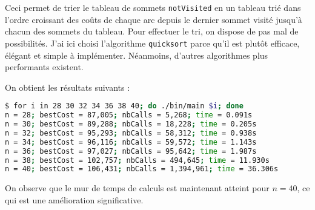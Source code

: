 Ceci permet de trier le tableau de sommets \texttt{notVisited} en un tableau trié dans l'ordre croissant des coûts de chaque arc depuis le dernier sommet visité jusqu'à chacun des sommets du tableau. Pour effectuer le tri, on dispose de pas mal de possibilités. J'ai ici choisi l'algorithme \texttt{quicksort} parce qu'il est plutôt efficace, élégant et simple à implémenter. Néanmoins, d'autres algorithmes plus performants existent.

On obtient les résultats suivants :

\begin{lstlisting}[language=bash, caption={Résultats d'exécution de l'algorithme \texttt{permut} avec l'heuristique d'ordre.}]
$ for i in 28 30 32 34 36 38 40; do ./bin/main $i; done
n = 28; bestCost = 87,005; nbCalls = 5,268; time = 0.091s
n = 30; bestCost = 89,288; nbCalls = 18,228; time = 0.205s
n = 32; bestCost = 95,293; nbCalls = 58,312; time = 0.938s
n = 34; bestCost = 96,116; nbCalls = 59,572; time = 1.143s
n = 36; bestCost = 97,027; nbCalls = 95,642; time = 1.987s
n = 38; bestCost = 102,757; nbCalls = 494,645; time = 11.930s
n = 40; bestCost = 106,431; nbCalls = 1,394,961; time = 36.306s
\end{lstlisting}

On observe que le mur de temps de calculs est maintenant atteint pour $n=40$, ce qui est une amélioration significative.

